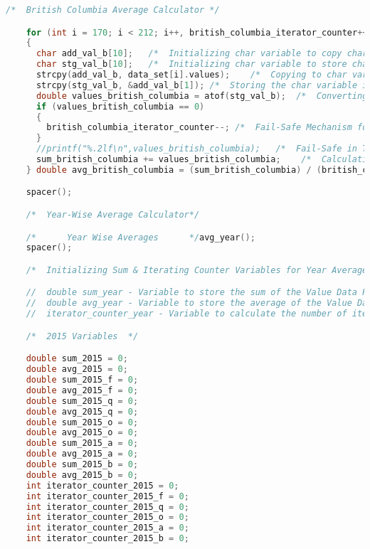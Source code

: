 \begin{lstlisting}[language=C, caption=\textit{CPS 188 Term Project Source Code}]
    /*  British Columbia Average Calculator */

    for (int i = 170; i < 212; i++, british_columbia_iterator_counter++)
    {
      char add_val_b[10];   /*  Initializing char variable to copy char pointer to char variable type   */
      char stg_val_b[10];   /*  Initializing char variable to store char to char recieved from char pointer */
      strcpy(add_val_b, data_set[i].values);    /*  Copying to char variable from char pointer variable */
      strcpy(stg_val_b, &add_val_b[1]); /*  Storing the char variable in another char variable to manipulate string literals    */
      double values_british_columbia = atof(stg_val_b);  /*  Converting the stored char variable to a float type varaible data type for mathematical computational maniupulation */
      if (values_british_columbia == 0)
      {
        british_columbia_iterator_counter--; /*  Fail-Safe Mechanism for not counting the iterations in the iterating counter factor if the condition is met [CONDITION IS ONLY SATISFIED IF THE atof FUNCTION RETURN 0, IFF THE Var(char) = NULL]   */
      }
      //printf("%.2lf\n",values_british_columbia);   /*  Fail-Safe in Testing phase to verify succinctity of the values being read from atof function    */
      sum_british_columbia += values_british_columbia;    /*  Calculation of Summa function of all data points being read that are not NULL   */
    } double avg_british_columbia = (sum_british_columbia) / (british_columbia_iterator_counter); printf("British Columbia Average: %.3lf\n", avg_british_columbia);

	spacer();

    /*  Year-Wise Average Calculator*/

	/*		Year Wise Averages		*/avg_year();
	spacer();

	/*  Initializing Sum & Iterating Counter Variables for Year Averages Calculation	*/

    //  double sum_year - Variable to store the sum of the Value Data Points subsequently in every iteration
	//	double avg_year - Variable to store the average of the Value Data Points subsequently after all iterations
    //  iterator_counter_year - Variable to calculate the number of iterations performed in the for loop

	/*	2015 Variables	*/

    double sum_2015 = 0;
	double avg_2015 = 0;
	double sum_2015_f = 0;
	double avg_2015_f = 0;
	double sum_2015_q = 0;
	double avg_2015_q = 0;
	double sum_2015_o = 0;
	double avg_2015_o = 0;
	double sum_2015_a = 0;
	double avg_2015_a = 0;
	double sum_2015_b = 0;
	double avg_2015_b = 0;
	int iterator_counter_2015 = 0;
	int iterator_counter_2015_f = 0;
	int iterator_counter_2015_q = 0;
	int iterator_counter_2015_o = 0;
	int iterator_counter_2015_a = 0;
	int iterator_counter_2015_b = 0;


\end{lstlisting}
